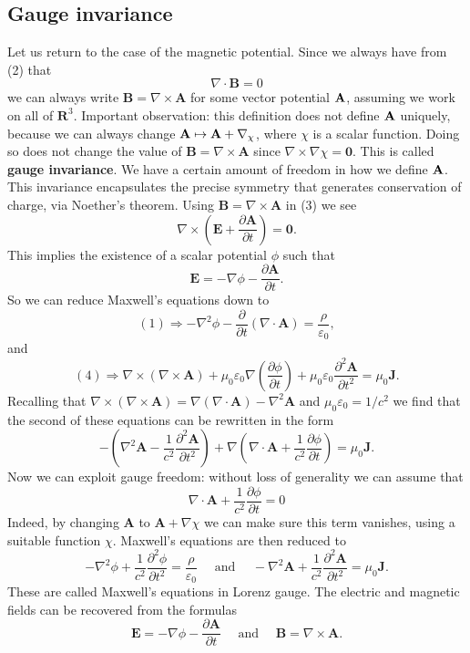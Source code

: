 \subsection{Gauge invariance}
Let us return to the case of the magnetic potential. Since we always have from (2) that
$$
    \nabla \cdot \mathbf{B}=0
$$
we can always write $\mathbf{B}=\nabla \times \mathbf{A}$ for some vector potential ${\bf A}$, assuming we work on all of $\mathbf{R}^{3}$. Important observation: this definition does not define ${\bf A}$ uniquely, because we can always change $ {\bf A} \mapsto {\bf A} + \nabla_\chi $, where $\chi$ is a scalar function. Doing so does not change the value of $\mathbf{B}=\nabla \times \mathbf{A}$ since $\nabla \times \nabla \chi=\mathbf{0}$. This is called \textbf{gauge invariance}. We have a certain amount of freedom in how we define ${\bf A}$. This invariance encapsulates the precise symmetry that generates conservation of charge, via Noether's theorem. Using $\mathbf{B}=\nabla \times \mathbf{A}$ in (3) we see
$$
    \nabla \times\left(\mathbf{E}+\frac{\partial \mathbf{A}}{\partial t}\right)=\mathbf{0}.
$$
This implies the existence of a scalar potential $\phi$ such that
$$
    \mathbf{E}=-\nabla \phi-\frac{\partial \mathbf{A}}{\partial t}.
$$
So we can reduce Maxwell's equations down to
$$
    (1) \Longrightarrow -\nabla^{2} \phi-\frac{\partial}{\partial t}(\nabla \cdot \mathbf{A})=\frac{\rho}{\varepsilon_{0}},
$$
and
$$
    (4) \Longrightarrow \nabla \times(\nabla \times \mathbf{A})+\mu_{0} \varepsilon_{0} \nabla\left(\frac{\partial \phi}{\partial t}\right)+\mu_{0} \varepsilon_{0} \frac{\partial^{2} \mathbf{A}}{\partial t^{2}}=\mu_{0} \mathbf{J}.
$$
Recalling that $\nabla \times(\nabla \times \mathbf{A})=\nabla(\nabla \cdot \mathbf{A})-\nabla^{2} \mathbf{A}$ and $\mu_{0} \varepsilon_{0}=1 / c^{2}$ we find that the second
of these equations can be rewritten in the form
$$
    -\left(\nabla^{2} \mathbf{A}-\frac{1}{c^{2}} \frac{\partial^{2} \mathbf{A}}{\partial t^{2}}\right)+\nabla\left(\nabla \cdot \mathbf{A}+\frac{1}{c^{2}} \frac{\partial \phi}{\partial t}\right)=\mu_{0} \mathbf{J}.
$$
Now we can exploit gauge freedom: without loss of generality we can assume that
\[
    \nabla \cdot \mathbf{A}+\frac{1}{c^{2}} \frac{\partial \phi}{\partial t}=0
\]
Indeed, by changing $\mathbf{A}$ to $\mathbf{A}+\nabla \chi$ we can make sure this term vanishes, using a suitable function $\chi$. Maxwell's equations are then reduced to
\[
    -\nabla^{2} \phi+\frac{1}{c^{2}} \frac{\partial^{2} \phi}{\partial t^{2}}=\frac{\rho}{\varepsilon_{0}} \quad \text { and } \quad-\nabla^{2} \mathbf{A}+\frac{1}{c^{2}} \frac{\partial^{2} \mathbf{A}}{\partial t^{2}}=\mu_{0} \mathbf{J}.
\]
These are called Maxwell's equations in Lorenz gauge. The electric and magnetic fields can be recovered from the formulas
\[
    \mathbf{E}=-\nabla \phi-\frac{\partial \mathbf{A}}{\partial t} \quad \text { and } \quad \mathbf{B}=\nabla \times \mathbf{A}.
\]
